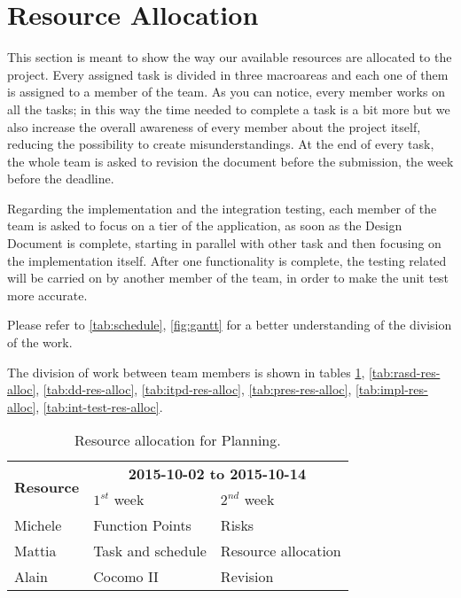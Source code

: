 \section{Resource Allocation}

This section is meant to show the way our available resources are allocated to the project. Every assigned task is divided in three macroareas and each one of them is assigned to a member of the team.
As you can notice, every member works on all the tasks; in this way the time needed to complete a task is a bit more but we also increase the overall awareness of every member about the project itself, reducing the possibility to create misunderstandings.
At the end of every task, the whole team is asked to revision the document before the submission, the week before the deadline.

Regarding the implementation and the integration testing, each member of the team is asked to focus on a tier of the application, as soon as the Design Document is complete, starting in parallel with other task and then focusing on the implementation itself.
After one functionality is complete, the testing related will be carried on by another member of the team, in order to make the unit test more accurate.

Please refer to \autoref{tab:schedule}, \autoref{fig:gantt} for a better understanding of the division of the work.

The division of work between team members is shown in tables \ref{tab:plan-res-alloc}, \ref{tab:rasd-res-alloc}, \ref{tab:dd-res-alloc}, \ref{tab:itpd-res-alloc}, \ref{tab:pres-res-alloc}, \ref{tab:impl-res-alloc}, \ref{tab:int-test-res-alloc}.

\begin{table} [htb]
    \centering
    \begin{tabular}{| l | l | l |}
        \hline
        \multirow{2}{*}{\textbf{Resource}} & \multicolumn{2}{c|}{\textbf{2015-10-02 to 2015-10-14}} \\
        \cline{2-3}
        & $1^{st}$ week & $2^{nd}$ week \\
        \hline
        Michele        & Function Points       & Risks      \\
        Mattia         & Task and schedule     & Resource allocation    \\
        Alain          & Cocomo II             & Revision    \\
        \hline
    \end{tabular}
    \caption{Resource allocation for Planning.}
    \label{tab:plan-res-alloc}
\end{table}

